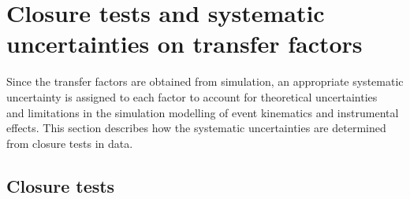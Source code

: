 \clearpage
\section{Closure tests and systematic uncertainties on transfer factors\label{sec:bkgd-syst}}

Since the transfer factors are obtained from simulation, an
appropriate systematic uncertainty is assigned to each factor to
account for theoretical uncertainties~\cite{Bern:2011pa} and
limitations in the simulation modelling of event kinematics and
instrumental effects. This section describes how the systematic
uncertainties are determined from closure tests in data.

\subsection{Closure tests\label{sec:closure-tests-desc}}

